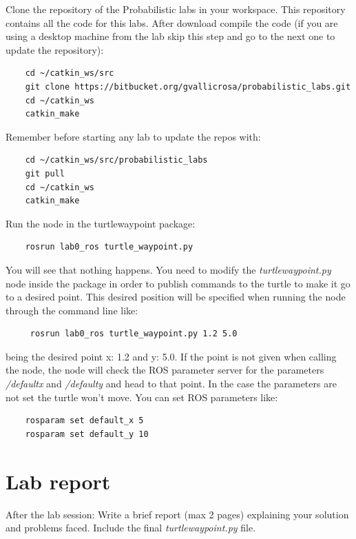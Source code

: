 \documentclass[a4paper,10pt]{article}
\begin{document}
\noindent
Clone the repository of the Probabilistic labs in your workspace. This repository contains all the code for this labs. After download compile the code (if you are using a desktop machine from the lab skip this step and go to the next one to update the repository):
\begin{verbatim}
    cd ~/catkin_ws/src
    git clone https://bitbucket.org/gvallicrosa/probabilistic_labs.git
    cd ~/catkin_ws
    catkin_make
\end{verbatim}
\noindent Remember before starting any lab to update the repos with:
\begin{verbatim}
    cd ~/catkin_ws/src/probabilistic_labs
    git pull
    cd ~/catkin_ws
    catkin_make
\end{verbatim}
\noindent
Run the node in the turtle{\textunderscore}waypoint package: 
\begin{verbatim}
    rosrun lab0_ros turtle_waypoint.py
\end{verbatim}
You will see that nothing happens. You need to modify the \emph{turtle{\textunderscore}waypoint.py} node inside the package in order to publish commands to the turtle to make it go to a desired point. This desired position will be specified when running the node through the command line like:
\begin{verbatim}
 	 rosrun lab0_ros turtle_waypoint.py 1.2 5.0
\end{verbatim}
being the desired point x: 1.2 and y: 5.0. If the point is not given when calling the node, the node will check the ROS parameter server for the parameters \emph{/default{\textunderscore}x} and \emph{/default{\textunderscore}y} and head to that point. In the case the parameters are not set the turtle won't move. You can set ROS parameters like:
\begin{verbatim}
    rosparam set default_x 5
    rosparam set default_y 10
\end{verbatim}

\section{Lab report}

After the lab session: Write a brief report (max 2 pages) explaining your solution and problems faced. Include the final \emph{turtle{\textunderscore}waypoint.py} file.
\end{document}
